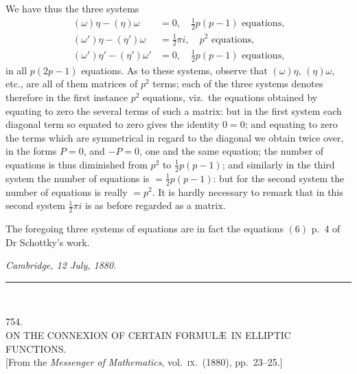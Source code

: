 \documentclass[11pt,a4paper]{article}
\begin{document}
We have thus the three systems
\begin{align*}
  (\omega)\eta - (\eta)\omega & = 0, \quad \tfrac{1}{2}p(p - 1) \text{ equations,} \\
  (\omega')\eta - (\eta')\omega & = \tfrac{1}{2}\pi i, \quad p^{2} \text{ equations,} \\
  (\omega')\eta' - (\eta')\omega' & = 0, \quad \tfrac{1}{2}p(p - 1) \text{ equations,}
\end{align*}
in all $p(2p - 1)$ equations.  As to these systems, observe that $(\omega)\eta$,
$(\eta)\omega$, etc., are all of them matrices of $p^{2}$ terms; each of the
three systems denotes therefore in the first instance $p^{2}$ equations,
viz.\ the equations obtained by equating to zero the several terms of such a
matrix: but in the first system each diagonal term so equated to zero gives
the identity $0 = 0$; and equating to zero the terms which are symmetrical
in regard to the diagonal we obtain twice over, in the forms $P = 0$, and
$-P = 0$, one and the same equation; the number of equations is thus
diminished from $p^{2}$ to $\tfrac{1}{2} p(p - 1)$; and similarly in the
third system the number of equations is $= \tfrac{1}{2} p(p - 1)$: but for
the second system the number of equations is really $= p^{2}$.  It is
hardly necessary to remark that in this second system $\tfrac{1}{2}\pi i$ is
as before regarded as a matrix.

The foregoing three systems of equations are in fact the equations $(6)$
p.\ 4 of Dr Schottky's work.

\medskip

\noindent\textit{Cambridge, 12 July, 1880.}

\bigskip
\noindent\rule{0.35\textwidth}{0.4pt}\\[2pt]


\bigskip

\begin{center}
\textsc{754.}\\[6pt]
\textsc{ON THE CONNEXION OF CERTAIN FORMUL\AE\ IN ELLIPTIC FUNCTIONS.}\\[6pt]
[From the \emph{Messenger of Mathematics}, vol.\ \textsc{ix}.\ (1880),
pp.\ 23--25.]
\end{center}
\end{document}

